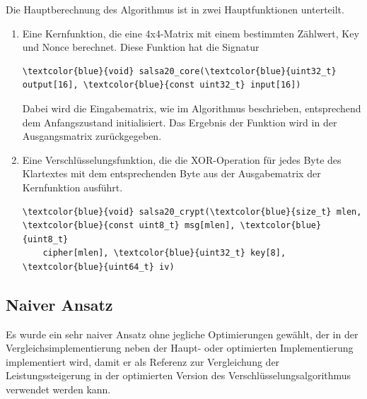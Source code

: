 \documentclass[course=erap]{aspdoc}
\begin{document}
Die Hauptberechnung des Algorithmus ist in zwei Hauptfunktionen unterteilt. 
\begin{enumerate}
    \item Eine Kernfunktion, die eine 4x4-Matrix mit einem bestimmten Zählwert, Key und Nonce berechnet. Diese Funktion hat die Signatur
    \begin{Verbatim}[commandchars=\\\{\}]
    \textcolor{blue}{void} salsa20_core(\textcolor{blue}{uint32_t} output[16], \textcolor{blue}{const uint32_t} input[16])
    \end{Verbatim}
    Dabei wird die Eingabematrix, wie im Algorithmus beschrieben, entsprechend dem Anfangszustand initialisiert. Das Ergebnis der Funktion wird in der Ausgangsmatrix zurückgegeben.
    \item Eine Verschlüsselungsfunktion, die die XOR-Operation für jedes Byte des Klartextes mit dem entsprechenden Byte aus der Ausgabematrix der Kernfunktion ausführt.
    \begin{Verbatim}[commandchars=\\\{\}]
    \textcolor{blue}{void} salsa20_crypt(\textcolor{blue}{size_t} mlen, \textcolor{blue}{const uint8_t} msg[mlen], \textcolor{blue}{uint8_t}
    cipher[mlen], \textcolor{blue}{uint32_t} key[8], \textcolor{blue}{uint64_t} iv)
    \end{Verbatim}
\end{enumerate}


\subsection{Naiver Ansatz}
Es wurde ein sehr naiver Ansatz ohne jegliche Optimierungen gewählt, der in der Vergleichsimplementierung neben der Haupt- oder optimierten Implementierung implementiert wird, damit er als Referenz zur Vergleichung der Leistungssteigerung in der optimierten Version des Verschlüsselungsalgorithmus verwendet werden kann. 
\end{document}
